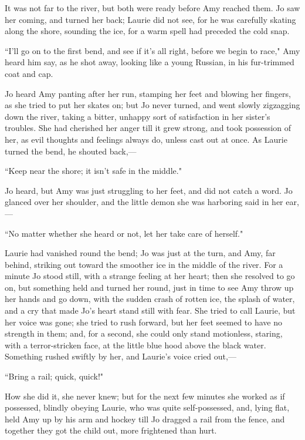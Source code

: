 It was not far to the river, but both were ready before Amy reached
them. Jo saw her coming, and turned her back; Laurie did not see, for he
was carefully skating along the shore, sounding the ice, for a warm
spell had preceded the cold snap.

``I'll go on to the first bend, and see if
it's all right, before we begin to race," Amy heard him
say, as he shot away, looking like a young Russian, in his fur-trimmed
coat and cap.

Jo heard Amy panting after her run, stamping her feet and blowing her
fingers, as she tried to put her skates on; but Jo never turned, and
went slowly zigzagging down the river, taking a bitter, unhappy sort of
satisfaction in her sister's troubles. She had cherished
her anger till it grew strong, and took possession of her, as evil
thoughts and feelings always do, unless cast out at once. As Laurie
turned the bend, he shouted back,---

``Keep near the shore; it isn't safe in the middle."

Jo heard, but Amy was just struggling to her feet, and did not catch a
word. Jo glanced over her shoulder, and the little demon she was
harboring said in her ear,---

``No matter whether she heard or not, let her take care of herself."

Laurie had vanished round the bend; Jo was just at the turn, and Amy,
far behind, striking out toward the smoother ice in the middle of the
river. For a minute Jo stood still, with a strange feeling at her heart;
then she resolved to go on, but something held and turned her round,
just in time to see Amy throw up her hands and go down, with the sudden
crash of rotten ice, the splash of water, and a cry that made
Jo's heart stand still with fear. She tried to call
Laurie, but her voice was gone; she tried to rush forward, but her feet
seemed to have no strength in them; and, for a second, she could only
stand motionless, staring, with a terror-stricken face, at the little
blue hood above the black water. Something rushed swiftly by her, and
Laurie's voice cried out,---

``Bring a rail; quick, quick!"

How she did it, she never knew; but for the next few minutes she worked
as if possessed, blindly obeying Laurie, who was quite self-possessed,
and, lying flat, held Amy up by his arm and hockey till Jo dragged a
rail from the fence, and together they got the child out, more
frightened than hurt.


